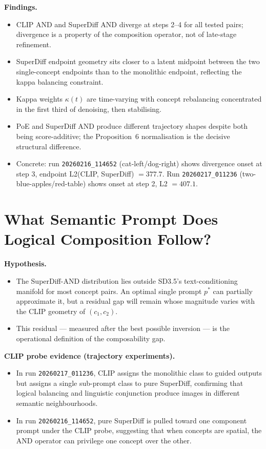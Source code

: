\documentclass[runningheads]{llncs}
\begin{document}
\textbf{Findings.}
\begin{itemize}
  \item CLIP AND and SuperDiff AND diverge at steps 2--4 for all tested
    pairs; divergence is a property of the composition operator, not
    of late-stage refinement.
  \item SuperDiff endpoint geometry sits closer to a latent midpoint
    between the two single-concept endpoints than to the monolithic
    endpoint, reflecting the kappa balancing constraint.
  \item Kappa weights $\kappa(t)$ are time-varying with concept rebalancing
    concentrated in the first third of denoising, then stabilising.
  \item PoE and SuperDiff AND produce different trajectory shapes despite
    both being score-additive; the Proposition~6 normalisation is the
    decisive structural difference.
  \item Concrete: run \texttt{20260216\_114652} (cat-left/dog-right)
    shows divergence onset at step 3, endpoint
    L2(CLIP, SuperDiff) $= 377.7$.
    Run \texttt{20260217\_011236} (two-blue-apples/red-table)
    shows onset at step 2, L2 $= 407.1$.
\end{itemize}

\section{What Semantic Prompt Does Logical Composition Follow?}

\textbf{Hypothesis.}
\begin{itemize}
  \item The SuperDiff-AND distribution lies outside SD3.5's
    text-conditioning manifold for most concept pairs.
    An optimal single prompt $p^*$ can partially approximate it, but a
    residual gap will remain whose magnitude varies with the CLIP geometry
    of $(c_1, c_2)$.
  \item This residual --- measured after the best possible inversion ---
    is the operational definition of the composability gap.
\end{itemize}

\textbf{CLIP probe evidence (trajectory experiments).}
\begin{itemize}
  \item In run \texttt{20260217\_011236}, CLIP assigns the monolithic class
    to guided outputs but assigns a single sub-prompt class to pure
    SuperDiff, confirming that logical balancing and linguistic conjunction
    produce images in different semantic neighbourhoods.
  \item In run \texttt{20260216\_114652}, pure SuperDiff is pulled toward
    one component prompt under the CLIP probe, suggesting that when concepts
    are spatial, the AND operator can privilege one concept over the other.
\end{itemize}
\end{document}
